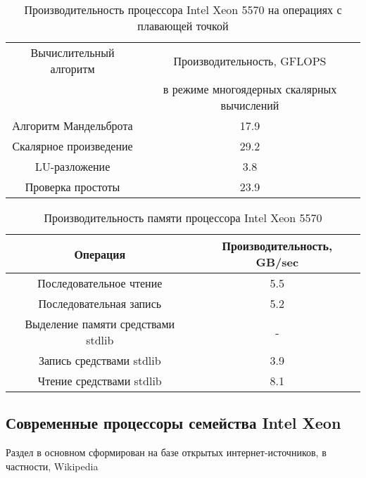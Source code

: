 \begin{table}[ht]
	\begin{center}
		\caption{Производительность процессора Intel Xeon  5570 на операциях с плавающей точкой}
		\begin{tabular}{|c|c|}
			\hline	
			Вычислительный алгоритм &  Производительность, GFLOPS \\ 
			& в режиме многоядерных скалярных вычислений \\ \hline
			Алгоритм Мандельброта  &  17.9 	\\ \hline
			Скалярное произведение &  29.2   \\ \hline
			LU-разложение          &  3.8  \\ \hline
			Проверка простоты      &  23.9  \\ \hline 
			
			
		\end{tabular}
	\end{center} 	
\end{table} 	

\begin{table}[ht]
	\begin{center}
		\caption{Производительность памяти процессора Intel Xeon 5570}
		\begin{tabular}{|c|c|}
			\hline	
			Операция  &  Производительность, GB/sec \\ \hline
			Последовательное чтение &  5.5 	\\  \hline
			Последовательная запись &  5.2   \\  \hline
			Выделение памяти средствами stdlib &  -  \\  \hline
			Запись средствами stdlib  & 3.9  \\ \hline
			Чтение средствами stdlib  & 8.1  \\ \hline 
		\end{tabular}
	\end{center} 	
\end{table} 	

\clearpage

\subsection{Современные процессоры семейства Intel Xeon}
Раздел в основном сформирован на базе открытых интернет-источников, в частности, Wikipedia 


